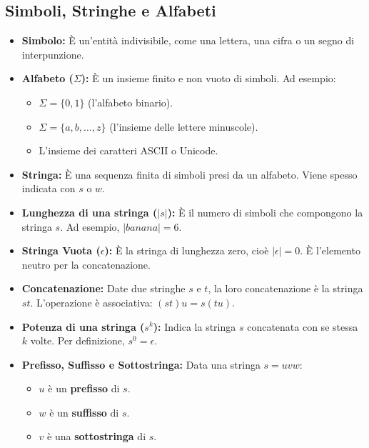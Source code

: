 \documentclass[a4paper, 11pt]{article}
\begin{document}
\subsection{Simboli, Stringhe e Alfabeti}
\begin{itemize}
    \item \textbf{Simbolo:} È un'entità indivisibile, come una lettera, una cifra o un segno di interpunzione.
    \item \textbf{Alfabeto ($\Sigma$):} È un insieme finito e non vuoto di simboli. Ad esempio:
    \begin{itemize}
        \item $\Sigma = \{0, 1\}$ (l'alfabeto binario).
        \item $\Sigma = \{a, b, \dots, z\}$ (l'insieme delle lettere minuscole).
        \item L'insieme dei caratteri ASCII o Unicode.
    \end{itemize}
    \item \textbf{Stringa:} È una sequenza finita di simboli presi da un alfabeto. Viene spesso indicata con $s$ o $w$.
    \item \textbf{Lunghezza di una stringa ($|s|$):} È il numero di simboli che compongono la stringa $s$. Ad esempio, $|banana| = 6$.
    \item \textbf{Stringa Vuota ($\epsilon$):} È la stringa di lunghezza zero, cioè $|\epsilon| = 0$. È l'elemento neutro per la concatenazione.
    \item \textbf{Concatenazione:} Date due stringhe $s$ e $t$, la loro concatenazione è la stringa $st$. L'operazione è associativa: $(st)u = s(tu)$.
    \item \textbf{Potenza di una stringa ($s^k$):} Indica la stringa $s$ concatenata con se stessa $k$ volte. Per definizione, $s^0 = \epsilon$.
    \item \textbf{Prefisso, Suffisso e Sottostringa:} Data una stringa $s=uvw$:
    \begin{itemize}
        \item $u$ è un \textbf{prefisso} di $s$.
        \item $w$ è un \textbf{suffisso} di $s$.
        \item $v$ è una \textbf{sottostringa} di $s$.
    \end{itemize}
\end{itemize}
\end{document}
